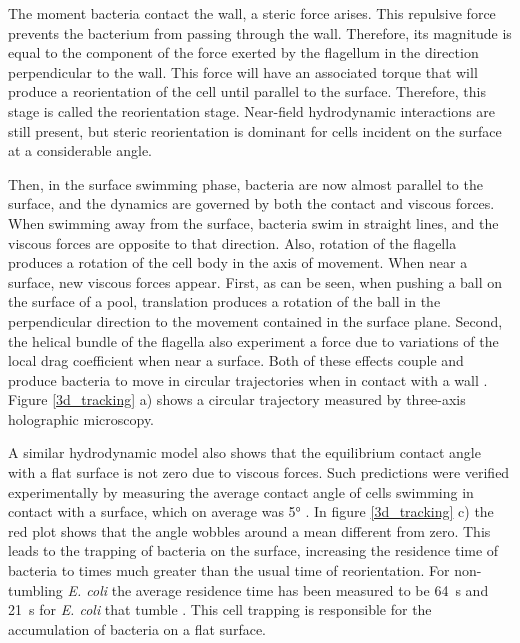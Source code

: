 The moment bacteria contact the wall, a steric force arises. This repulsive force prevents the bacterium from passing through the wall. Therefore, its magnitude is equal to the component of the force exerted by the flagellum in the direction perpendicular to the wall. This force will have an associated torque that will produce a reorientation of the cell until parallel to the surface. Therefore, this stage is called the reorientation stage. Near-field hydrodynamic interactions are still present, but steric reorientation is dominant for cells incident on the surface at a considerable angle.

Then, in the surface swimming phase, bacteria are now almost parallel to the surface, and the dynamics are governed by both the contact and viscous forces. When swimming away from the surface, bacteria swim in straight lines, and the viscous forces are opposite to that direction. Also, rotation of the flagella produces a rotation of the cell body in the axis of movement. When near a surface, new viscous forces appear. First, as can be seen, when pushing a ball on the surface of a pool, translation produces a rotation of the ball in the perpendicular direction to the movement contained in the surface plane. Second, the helical bundle of the flagella also experiment a force due to variations of the local drag coefficient when near a surface. Both of these effects couple and produce bacteria to move in circular trajectories when in contact with a wall \cite{Lauga2006SwimmingBoundaries}. Figure \ref{3d_tracking} a) shows a circular trajectory measured by three-axis holographic microscopy.

A similar hydrodynamic model also shows that the equilibrium contact angle with a flat surface is not zero due to viscous forces. Such predictions were verified experimentally by measuring the average contact angle of cells swimming in contact with a surface, which on average was \ang{5} \cite{Sipos2015HydrodynamicWalls}. In figure \ref{3d_tracking} c) the red plot shows that the angle wobbles around a mean different from zero. This leads to the trapping of bacteria on the surface, increasing the residence time of bacteria to times much greater than the usual time of reorientation. For non-tumbling \textit{E. coli} the average residence time has been measured to be \SI{64}{\second} \cite{Drescher2011FluidScattering} and  \SI{21}{\second} for \textit{E. coli} that tumble \cite{Junot2021Run-to-tumbleBacteria}. This cell trapping is responsible for the accumulation of bacteria on a flat surface.

